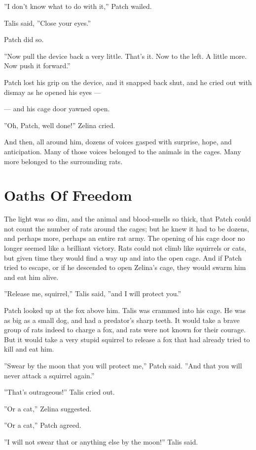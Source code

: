 \documentclass[12pt]{book}
\begin{document}
''I don't know what to do with it,'' Patch wailed.

Talis said, ''Close your eyes.''

Patch did so.

''Now pull the device back a very little. That's it. Now to the
left. A little more. Now push it forward.''

Patch lost his grip on the device, and it snapped back shut, and he
cried out with dismay as he opened his eyes ---

--- and his cage door yawned open.

''Oh, Patch, well done!'' Zelina cried.

And then, all around him, dozens of voices gasped with surprise, hope,
and anticipation. Many of those voices belonged to the animals in the
cages. Many more belonged to the surrounding rats.


\section{Oaths Of Freedom}

The light was so dim, and the animal and blood-smells so thick, that
Patch could not count the number of rats around the cages; but he knew
it had to be dozens, and perhaps more, perhaps an entire rat army. The
opening of his cage door no longer seemed like a brilliant
victory. Rats could not climb like squirrels or cats, but given time
they would find a way up and into the open cage. And if Patch tried to
escape, or if he descended to open Zelina's cage, they would swarm him
and eat him alive.

''Release me, squirrel,'' Talis said, ''and I will protect you.''

Patch looked up at the fox above him. Talis was crammed into his
cage. He was as big as a small dog, and had a predator's sharp
teeth. It would take a brave group of rats indeed to charge a fox, and
rats were not known for their courage. But it would take a very stupid
squirrel to release a fox that had already tried to kill and eat him.

''Swear by the moon that you will protect me,'' Patch said. ''And that
you will never attack a squirrel again.''

''That's outrageous!'' Talis cried out.

''Or a cat,'' Zelina suggested.

''Or a cat,'' Patch agreed.

''I will not swear that or anything else by the moon!'' Talis said.
\end{document}
